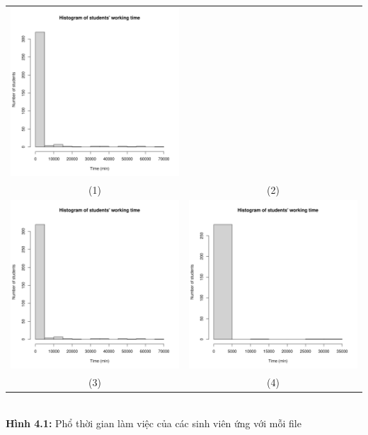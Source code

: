 \documentclass[a4paper]{article}
\theoremstyle{definition}
\begin{document}
\begin{enumerate}[a)]
\begin{itemize}
\begin{center}
\begin{tabular}{c c}
                 \includegraphics[width = 6.9cm]{Images/img4-1-2.png} \\
                 (1) & (2) \\
                 \includegraphics[width = 6.9cm]{Images/img4-1-2.png} &
                 \includegraphics[width = 6.9cm]{Images/img4-1-3.png} \\
                 (3) & (4)
            \end{tabular}\\
            \textbf{Hình 4.1:} Phổ thời gian làm việc của các sinh viên ứng với mỗi file\\

\end{center}
\end{itemize}
\end{enumerate}
\end{document}
